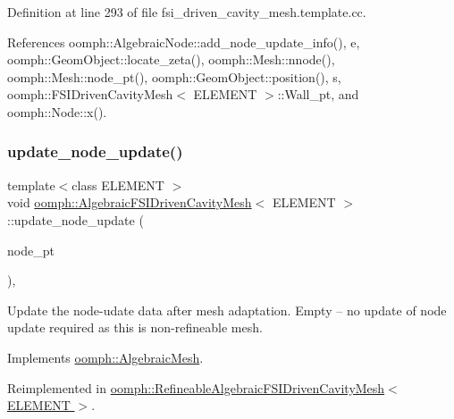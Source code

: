Definition at line 293 of file fsi\+\_\+driven\+\_\+cavity\+\_\+mesh.\+template.\+cc.



References oomph\+::\+Algebraic\+Node\+::add\+\_\+node\+\_\+update\+\_\+info(), e, oomph\+::\+Geom\+Object\+::locate\+\_\+zeta(), oomph\+::\+Mesh\+::nnode(), oomph\+::\+Mesh\+::node\+\_\+pt(), oomph\+::\+Geom\+Object\+::position(), s, oomph\+::\+F\+S\+I\+Driven\+Cavity\+Mesh$<$ E\+L\+E\+M\+E\+N\+T $>$\+::\+Wall\+\_\+pt, and oomph\+::\+Node\+::x().

\mbox{\label{classoomph_1_1AlgebraicFSIDrivenCavityMesh_a87d34d6cf84c62a9049773451c664176}} 
\subsubsection{\texorpdfstring{update\+\_\+node\+\_\+update()}{update\_node\_update()}}
{\footnotesize\ttfamily template$<$class E\+L\+E\+M\+E\+NT $>$ \\
void \hyperlink{classoomph_1_1AlgebraicFSIDrivenCavityMesh}{oomph\+::\+Algebraic\+F\+S\+I\+Driven\+Cavity\+Mesh}$<$ E\+L\+E\+M\+E\+NT $>$\+::update\+\_\+node\+\_\+update (\begin{DoxyParamCaption}\item[{\hyperlink{classoomph_1_1AlgebraicNode}{Algebraic\+Node} $\ast$\&}]{node\+\_\+pt }\end{DoxyParamCaption})\hspace{0.3cm}{\ttfamily [inline]}, {\ttfamily [virtual]}}



Update the node-\/udate data after mesh adaptation. Empty -- no update of node update required as this is non-\/refineable mesh. 



Implements \hyperlink{classoomph_1_1AlgebraicMesh_a6c6a35ae2be6e2766f5b80d85693c1ce}{oomph\+::\+Algebraic\+Mesh}.



Reimplemented in \hyperlink{classoomph_1_1RefineableAlgebraicFSIDrivenCavityMesh_aa68685323573763e1ded0cceed5ad14f}{oomph\+::\+Refineable\+Algebraic\+F\+S\+I\+Driven\+Cavity\+Mesh$<$ E\+L\+E\+M\+E\+N\+T $>$}.



